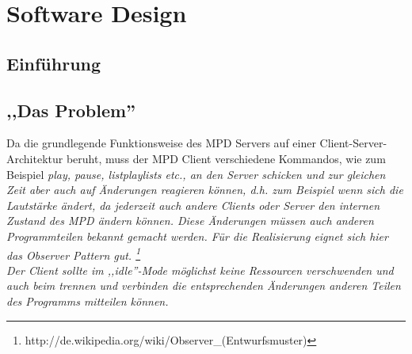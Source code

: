 
\chapter{Software Design}

\section{Einführung}

\section{,,Das Problem''}

Da die grundlegende Funktionsweise des MPD Servers auf einer Client-Server-Architektur beruht, muss der MPD Client
verschiedene Kommandos, wie zum Beispiel \it play, pause, listplaylists \rm etc., an den Server schicken
und zur gleichen Zeit aber auch auf Änderungen reagieren können, d.h. zum Beispiel wenn sich die Lautstärke ändert,
da jederzeit auch andere Clients oder Server den internen Zustand des MPD ändern können.
Diese Änderungen müssen auch anderen Programmteilen bekannt gemacht werden.
Für die Realisierung eignet sich hier das Observer Pattern gut. \footnote{http://de.wikipedia.org/wiki/Observer\_(Entwurfsmuster)}
\\
Der Client sollte im ,,idle''-Mode möglichst keine Ressourcen verschwenden und auch beim 
trennen und verbinden die entsprechenden Änderungen anderen Teilen des Programms mitteilen
können. 
\\

